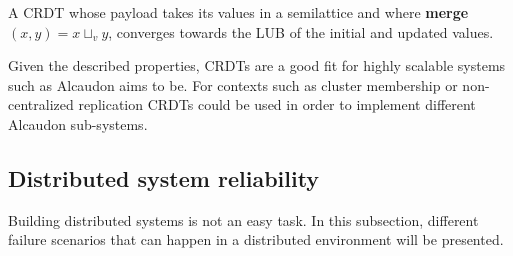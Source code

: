 A \acs{CRDT} whose payload takes its values in a semilattice and where
\textbf{merge}$(x,y) = x \sqcup_v y$, converges towards the LUB of the initial
and updated values.

Given the described properties, \acs{CRDT}s are a good fit for highly scalable systems
such as Alcaudon aims to be. For contexts such as cluster membership or non-centralized
replication \acs{CRDT}s could be used in order to implement different Alcaudon sub-systems.

\subsection{Distributed system reliability}

Building distributed systems is not an easy task. In this subsection, different
failure scenarios that can happen in a distributed environment will be presented.

